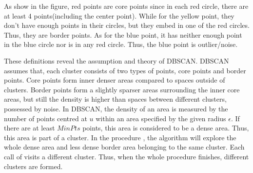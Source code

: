 As show in the figure, red points are core points since in each red circle, there are at least 4 points(including the center point). While for the yellow point, they don't have enough points in their circles, but they embed in one of the red circles. Thus, they are border points. As for the blue point, it has neither enough point in the blue circle nor is in any red circle. Thus, the blue point is outlier/noise.

These definitions reveal the assumption and theory of DBSCAN. DBSCAN assumes that, each cluster consists of two types of points, core points and border points. Core points form inner denser areas compared to spaces outside of clusters. Border points form a slightly sparser areas surrounding the inner core areas, but still the density is higher than spaces between different clusters, possessed by noise. In DBSCAN, the density of an area is measured by the number of points centred at $u$ within an area specified by the given radius $\epsilon$. If there are at least $MinPts$ points, this area is considered to be a dense area. Thus, this area is part of a cluster. In the procedure , the algorithm will explore the whole dense area and less dense border area belonging to the same cluster. Each call of  visits a different cluster. Thus, when the whole procedure  finishes, different clusters are formed.

